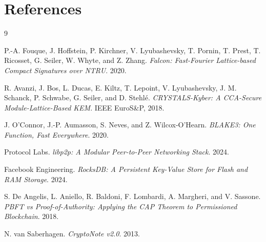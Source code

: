 \documentclass[11pt,a4paper]{article}
\theoremstyle{definition}
\theoremstyle{plain}
\begin{document}
\section{References}

\begin{thebibliography}{9}

P.-A. Fouque, J. Hoffstein, P. Kirchner, V. Lyubashevsky, T. Pornin,
T. Prest, T. Ricosset, G. Seiler, W. Whyte, and Z. Zhang.
\emph{Falcon: Fast-Fourier Lattice-based Compact Signatures over NTRU}.
2020.

R. Avanzi, J. Bos, L. Ducas, E. Kiltz, T. Lepoint, V. Lyubashevsky,
J. M. Schanck, P. Schwabe, G. Seiler, and D. Stehl\'e.
\emph{CRYSTALS-Kyber: A CCA-Secure Module-Lattice-Based KEM}.
IEEE EuroS\&P, 2018.

J. O'Connor, J.-P. Aumasson, S. Neves, and Z. Wilcox-O'Hearn.
\emph{BLAKE3: One Function, Fast Everywhere}.
2020.

Protocol Labs.
\emph{libp2p: A Modular Peer-to-Peer Networking Stack}.
2024.

Facebook Engineering.
\emph{RocksDB: A Persistent Key-Value Store for Flash and RAM Storage}.
2024.

S. De Angelis, L. Aniello, R. Baldoni, F. Lombardi, A. Margheri, and
V. Sassone.
\emph{PBFT vs Proof-of-Authority: Applying the CAP Theorem to Permissioned
Blockchain}.
2018.

N. van Saberhagen.
\emph{CryptoNote v2.0}.
2013.

\end{thebibliography}
\end{document}
